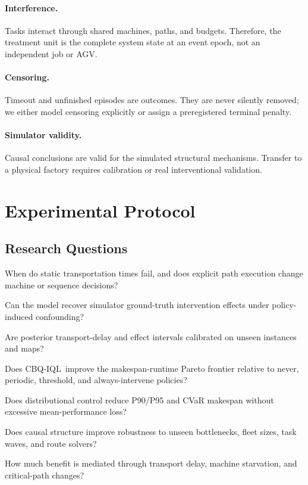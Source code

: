 \documentclass[11pt,a4paper]{article}
\newcommand{\algo}{CBQ-IQL}
\begin{document}
\paragraph{Interference.}
Tasks interact through shared machines, paths, and budgets. Therefore, the
treatment unit is the complete system state at an event epoch, not an
independent job or AGV.

\paragraph{Censoring.}
Timeout and unfinished episodes are outcomes. They are never silently removed;
we either model censoring explicitly or assign a preregistered terminal penalty.

\paragraph{Simulator validity.}
Causal conclusions are valid for the simulated structural mechanisms. Transfer
to a physical factory requires calibration or real interventional validation.

\section{Experimental Protocol}
\label{sec:experiments}

\subsection{Research Questions}

\begin{description}[leftmargin=2.0cm,style=nextline]
    \item[RQ1: Coupling]
    When do static transportation times fail, and does explicit path execution
    change machine or sequence decisions?

    \item[RQ2: Causal identification]
    Can the model recover simulator ground-truth intervention effects under
    policy-induced confounding?

    \item[RQ3: Calibration]
    Are posterior transport-delay and effect intervals calibrated on unseen
    instances and maps?

    \item[RQ4: Budgeted control]
    Does \algo\ improve the makespan-runtime Pareto frontier relative to never,
    periodic, threshold, and always-intervene policies?

    \item[RQ5: Tail risk]
    Does distributional control reduce P90/P95 and CVaR makespan without
    excessive mean-performance loss?

    \item[RQ6: Mechanism generalization]
    Does causal structure improve robustness to unseen bottlenecks, fleet sizes,
    task waves, and route solvers?

    \item[RQ7: Mechanism]
    How much benefit is mediated through transport delay, machine starvation,
    and critical-path changes?
\end{description}
\end{document}
